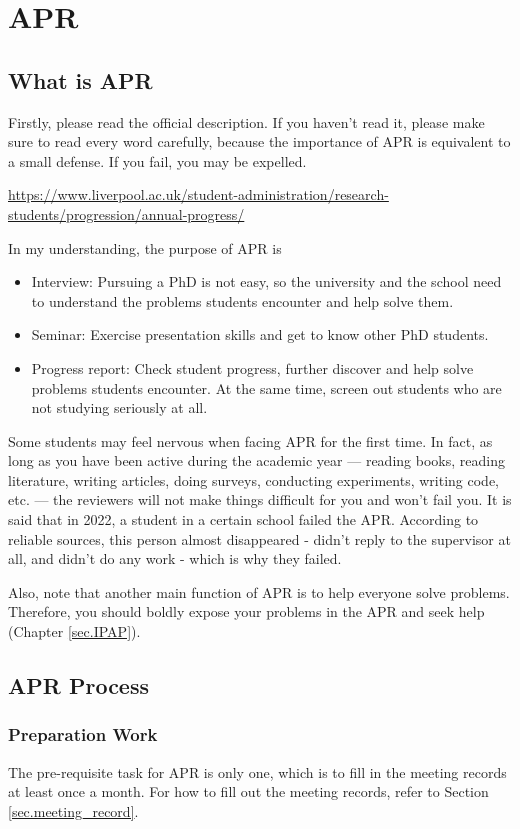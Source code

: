 \section{APR}
\subsection{What is APR}
Firstly, please read the official description. If you haven't read it, please make sure to read every word carefully, because the importance of APR is equivalent to a small defense. If you fail, you may be expelled.

\url{https://www.liverpool.ac.uk/student-administration/research-students/progression/annual-progress/}

In my understanding, the purpose of APR is
\begin{itemize}
    \item Interview: Pursuing a PhD is not easy, so the university and the school need to understand the problems students encounter and help solve them.
    \item Seminar: Exercise presentation skills and get to know other PhD students.
    \item Progress report: Check student progress, further discover and help solve problems students encounter. At the same time, screen out students who are not studying seriously at all.
\end{itemize}

Some students may feel nervous when facing APR for the first time. In fact, as long as you have been active during the academic year — reading books, reading literature, writing articles, doing surveys, conducting experiments, writing code, etc. — the reviewers will not make things difficult for you and won't fail you. It is said that in 2022, a student in a certain school failed the APR. According to reliable sources, this person almost disappeared - didn't reply to the supervisor at all, and didn't do any work - which is why they failed.

Also, note that another main function of APR is to help everyone solve problems. Therefore, you should boldly expose your problems in the APR and seek help (Chapter \ref{sec.IPAP}).

\subsection{APR Process}
\subsubsection{Preparation Work}
The pre-requisite task for APR is only one, which is to fill in the meeting records at least once a month. For how to fill out the meeting records, refer to Section \ref{sec.meeting_record}.

